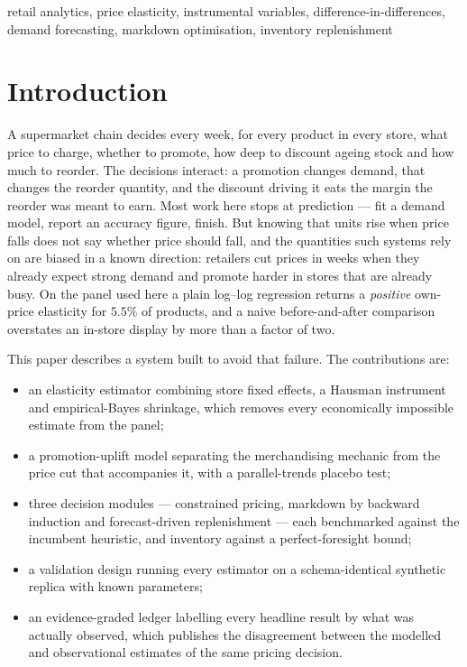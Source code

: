 \documentclass[conference,a4paper]{IEEEtran}
\begin{document}
\begin{IEEEkeywords}
retail analytics, price elasticity, instrumental variables,
difference-in-differences, demand forecasting, markdown optimisation,
inventory replenishment
\end{IEEEkeywords}

\section{Introduction}

A supermarket chain decides every week, for every product in every store, what
price to charge, whether to promote, how deep to discount ageing stock and how
much to reorder. The decisions interact: a promotion changes demand, that changes
the reorder quantity, and the discount driving it eats the margin the reorder was
meant to earn. Most work here stops at prediction --- fit a demand model, report
an accuracy figure, finish. But knowing that units rise when price falls does not
say whether price should fall, and the quantities such systems rely on are biased
in a known direction: retailers cut prices in weeks when they already expect
strong demand and promote harder in stores that are already busy. On the panel
used here a plain log--log regression returns a \emph{positive} own-price
elasticity for $5.5\%$ of products, and a naive before-and-after comparison
overstates an in-store display by more than a factor of two.

This paper describes a system built to avoid that failure. The contributions
are:

\begin{itemize}
\item an elasticity estimator combining store fixed effects, a Hausman
      instrument and empirical-Bayes shrinkage, which removes every
      economically impossible estimate from the panel;
\item a promotion-uplift model separating the merchandising mechanic from the
      price cut that accompanies it, with a parallel-trends placebo test;
\item three decision modules --- constrained pricing, markdown by backward
      induction and forecast-driven replenishment --- each benchmarked against
      the incumbent heuristic, and inventory against a perfect-foresight bound;
\item a validation design running every estimator on a schema-identical
      synthetic replica with known parameters;
\item an evidence-graded ledger labelling every headline result by what was
      actually observed, which publishes the disagreement between the modelled
      and observational estimates of the same pricing decision.
\end{itemize}
\end{document}
